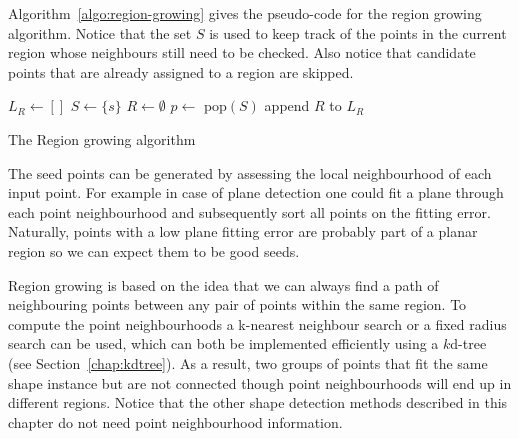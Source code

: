 Algorithm~\ref{algo:region-growing} gives the pseudo-code for the region growing algorithm.
Notice that the set $S$ is used to keep track of the points in the current region whose neighbours still need to be checked.
Also notice that candidate points that are already assigned to a region are skipped.
\begin{algorithm}
	
	$L_R \leftarrow [\xspace]$\;
	 {
		$S \leftarrow \{s\}$\;
		$R \leftarrow \emptyset$\;
		{
			$p \leftarrow $ pop$(S)$\;
			{
				 {
				}
			}
		}
		append $R$ to $L_R$\;
	}
	\caption{The Region growing algorithm}
	\label{algo:region-growing}
\end{algorithm}

The seed points can be generated by assessing the local neighbourhood of each input point. 
For example in case of plane detection one could fit a plane through each point neighbourhood and subsequently sort all points on the fitting error. 
Naturally, points with a low plane fitting error are probably part of a planar region so we can expect them to be good seeds.

Region growing is based on the idea that we can always find a path of neighbouring points between any pair of points within the same region.
To compute the point neighbourhoods a k-nearest neighbour search or a fixed radius search can be used, which can both be implemented efficiently using a $k$d-tree (see Section~\ref{chap:kdtree}).
As a result, two groups of points that fit the same shape instance but are not connected though point neighbourhoods will end up in different regions.
Notice that the other shape detection methods described in this chapter do not need point neighbourhood information.





